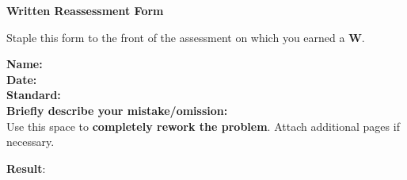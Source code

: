 \documentclass[letterpaper]{article}
\begin{document}
\begin{center}
{\Large \bf Written Reassessment Form} \\
\large \course
\end{center}


Staple this form to the front of the assessment on which you earned a {\bf W}.	
\vspace{0.2in}

\begin{flushleft}
{\bf Name: } \underline{\phantom{xxxxxxxxxxxxxxxxxxxxxxxxxxxxxxxxxxxxxxxxxxxxxxxxxxxxxxxxx}} \\
\vspace{0.15in}
{\bf Date: } \underline{\phantom{xxxxxxxxxxxxxxxxxxxxxxxxxxxxxxxxxxxxxxxxxxxxxxxxxxxxxxxxx}} \\
\vspace{0.15in}
{\bf Standard: } \underline{\phantom{xxxxxxxxxxxxxxxxxxx}} \\
\vspace{0.15in}
{\bf Briefly describe your mistake/omission: } \\
\vspace{0.4in}
Use this space to {\bf completely rework the problem}.  Attach additional pages if necessary.

\vfill

\hfill {\bf Result}: \fbox{\rule{0.5in}{0pt}\rule[-0.5ex]{0pt}{4ex}}

\end{flushleft}
\end{document}
